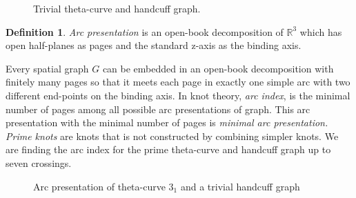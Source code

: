\documentclass{article}
\theoremstyle{definition}
\newtheorem{defn}[thm]{Definition}
\theoremstyle{theorem}
\theoremstyle{proposition}
\theoremstyle{corollary}
\begin{document}
\begin{figure}[h]
    \centering
    \hspace{0.05\linewidth}
    \caption{Trivial theta-curve and handcuff graph.}
    \label{figure_1} 
\end{figure}

\begin{defn}
    \textit{Arc presentation} is an open-book decomposition of $\mathbb{R}^3$ which has open half-planes as pages and the standard z-axis as the binding axis.
\end{defn}

Every spatial graph $G$ can be embedded in an open-book decomposition with finitely many pages so that it meets each page in exactly one simple arc with two different end-points on the binding axis.
In knot theory, \textit{arc index}, is the minimal number of pages among all possible arc presentations of graph. This arc presentation with the minimal number of pages is \textit{minimal arc presentation.} \textit{Prime knots} are knots that is not constructed by combining simpler knots. We are finding the arc index for the prime theta-curve and handcuff graph up to seven crossings.

\begin{figure}[h]
    \centering
    \caption{Arc presentation of theta-curve $3_1$ and a trivial handcuff graph}
    \label{figure_1} 
\end{figure}
\end{document}
